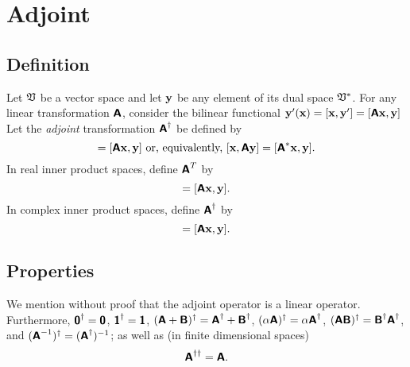 \section{Adjoint}
\label{2014-m-fdvs-adjoint}

\subsection{Definition}

Let ${\frak V}$ be a vector space and let ${\bf y}$
be any element of its dual space ${\frak V}^\ast$.
For any linear transformation $\textsf{\textbf{A}}$, consider
the bilinear functional
${\bf y}' ({\bf x}) =[{\bf x} ,{\bf y}'] =[\textsf{\textbf{A}}{\bf x},{\bf y}]$
Let the {\em adjoint} transformation $\textsf{\textbf{A}}^\dagger$ be defined by
\begin{equation}
[{\bf x},\textsf{\textbf{A}}^\ast{\bf y}]=
[\textsf{\textbf{A}}{\bf x},{\bf y}]
\textrm{ or, equivalently, }
[{\bf x},\textsf{\textbf{A}}{\bf y}]=
[\textsf{\textbf{A}}^\ast{\bf x},{\bf y}]
.
\end{equation}
In real inner product spaces, define $\textsf{\textbf{A}}^T$ by
\begin{equation}
[{\bf x},\textsf{\textbf{A}}^T{\bf y}]=
[\textsf{\textbf{A}}{\bf x},{\bf y}].
\end{equation}
In complex inner product spaces, define $\textsf{\textbf{A}}^\dagger$ by
\begin{equation}
[{\bf x},\textsf{\textbf{A}}^\dagger{\bf y}]=
[\textsf{\textbf{A}}{\bf x},{\bf y}].
\end{equation}


\subsection{Properties}
We mention without proof that the adjoint operator is a linear operator.
Furthermore,
$\textsf{\textbf{0}}^\dagger = \textsf{\textbf{0}}$,
$\textsf{\textbf{1}}^\dagger = \textsf{\textbf{1}}$,
$(\textsf{\textbf{A}}+\textsf{\textbf{B}})^\dagger = \textsf{\textbf{A}}^\dagger+\textsf{\textbf{B}}^\dagger$,
$(\alpha \textsf{\textbf{A}})^\dagger = \alpha \textsf{\textbf{A}}^\dagger$,
$( \textsf{\textbf{A}}\textsf{\textbf{B}})^\dagger =   \textsf{\textbf{B}}^\dagger
 \textsf{\textbf{A}}^\dagger$,
and
$( \textsf{\textbf{A}}^{-1})^\dagger
=
( \textsf{\textbf{A}}^\dagger )^{-1}
$;
as well as  (in finite dimensional spaces)
\begin{equation}
\textsf{\textbf{A}}^{\dagger \dagger}=
\textsf{\textbf{A}}.
\end{equation}

